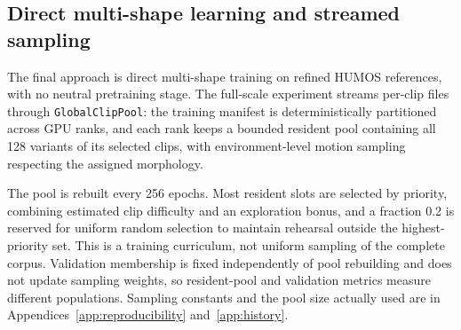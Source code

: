 \subsection{Direct multi-shape learning and streamed sampling}\label{sec:sampling}

The final approach is direct multi-shape training on refined HUMOS
references, with no neutral pretraining stage. The full-scale experiment
streams per-clip files through \texttt{GlobalClipPool}: the training manifest
is deterministically partitioned across GPU ranks, and each rank keeps a
bounded resident pool containing all 128 variants of its selected clips, with
environment-level motion sampling respecting the assigned morphology.

The pool is rebuilt every 256 epochs. Most resident slots are selected by
priority, combining estimated clip difficulty and an exploration bonus, and a
fraction 0.2 is reserved for uniform random selection to maintain rehearsal
outside the highest-priority set. This is a training curriculum, not uniform
sampling of the complete corpus. Validation membership is fixed independently
of pool rebuilding and does not update sampling weights, so resident-pool and
validation metrics measure different populations. Sampling constants and the
pool size actually used are in Appendices~\ref{app:reproducibility}
and~\ref{app:history}.
